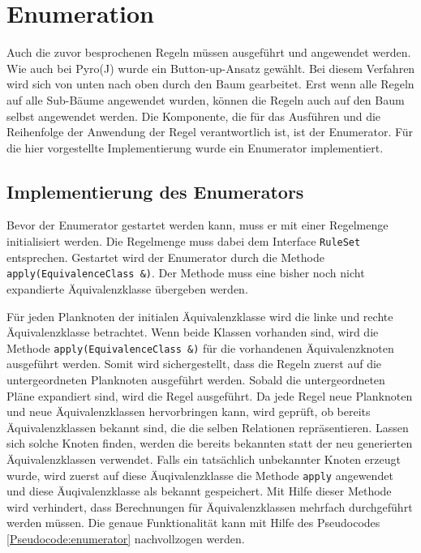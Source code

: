\section{Enumeration}

Auch die zuvor besprochenen Regeln müssen ausgeführt und angewendet werden. Wie auch bei Pyro(J) wurde ein Button-up-Ansatz gewählt. Bei diesem Verfahren wird sich von unten nach oben durch den Baum gearbeitet. Erst wenn alle Regeln auf alle Sub-Bäume angewendet wurden, können die Regeln auch auf den Baum selbst angewendet werden. Die Komponente, die für das Ausführen und die Reihenfolge der Anwendung der Regel verantwortlich ist, ist der Enumerator. Für die hier vorgestellte Implementierung wurde ein Enumerator implementiert.


\subsection{Implementierung des Enumerators}

Bevor der Enumerator gestartet werden kann, muss er mit einer Regelmenge initialisiert werden. Die Regelmenge muss dabei dem Interface \texttt{RuleSet} entsprechen. Gestartet wird der Enumerator durch die Methode \texttt{apply(EquivalenceClass \&)}. Der Methode muss eine bisher noch nicht expandierte Äquivalenzklasse übergeben werden. 

Für jeden Planknoten der initialen Äquivalenzklasse wird die linke und rechte Äquivalenzklasse betrachtet. Wenn beide Klassen vorhanden sind, wird die Methode \texttt{apply(EquivalenceClass \&)} für die vorhandenen Äquivalenzknoten ausgeführt werden. Somit wird sichergestellt, dass die Regeln zuerst auf die untergeordneten Planknoten ausgeführt werden. Sobald die untergeordneten Pläne expandiert sind, wird die Regel ausgeführt. Da jede Regel neue Planknoten und neue Äquivalenzklassen hervorbringen kann, wird geprüft, ob bereits Äquivalenzklassen bekannt sind, die die selben Relationen repräsentieren. Lassen sich solche Knoten finden, werden die bereits bekannten statt der neu generierten Äquivalenzklassen verwendet. Falls ein tatsächlich unbekannter Knoten erzeugt wurde, wird zuerst auf diese Äuqivalenzklasse die Methode \texttt{apply} angewendet und diese Äuqivalenzklasse als bekannt gespeichert. Mit Hilfe dieser Methode wird verhindert, dass Berechnungen für Äquivalenzklassen mehrfach durchgeführt werden müssen. Die genaue Funktionalität kann mit Hilfe des Pseudocodes \ref{Pseudocode:enumerator} nachvollzogen werden.

